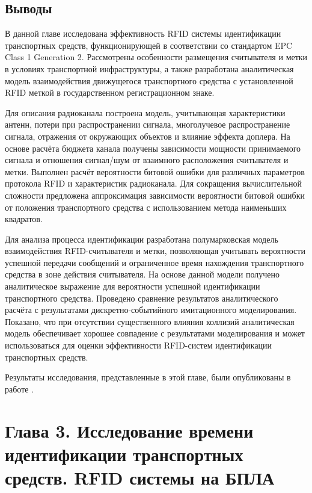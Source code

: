 \documentclass[12pt]{article}
\theoremstyle{definition}
\begin{document}
\subsection*{Выводы}

В данной главе исследована эффективность RFID системы идентификации транспортных средств, функционирующей в соответствии со стандартом EPC Class 1 Generation 2. Рассмотрены особенности размещения считывателя и метки в условиях транспортной инфраструктуры, а также разработана аналитическая модель взаимодействия движущегося транспортного средства с установленной RFID меткой в государственном регистрационном знаке.

Для описания радиоканала построена модель, учитывающая характеристики антенн, потери при распространении сигнала, многолучевое распространение сигнала, отражения от окружающих объектов и влияние эффекта доплера. На основе расчёта бюджета канала получены зависимости мощности принимаемого сигнала и отношения сигнал/шум от взаимного расположения считывателя и метки. Выполнен расчёт вероятности битовой ошибки для различных параметров протокола RFID и характеристик радиоканала. Для сокращения вычислительной сложности предложена аппроксимация зависимости вероятности битовой ошибки от положения транспортного средства с использованием метода наименьших квадратов.

Для анализа процесса идентификации разработана полумарковская модель взаимодействия RFID-считывателя и метки, позволяющая учитывать вероятности успешной передачи сообщений и ограниченное время нахождения транспортного средства в зоне действия считывателя. На основе данной модели получено аналитическое выражение для вероятности успешной идентификации транспортного средства. Проведено сравнение результатов аналитического расчёта с результатами дискретно-событийного имитационного моделирования. Показано, что при отсутствии существенного влияния коллизий аналитическая модель обеспечивает хорошее совпадение с результатами моделирования и может использоваться для оценки эффективности RFID-систем идентификации транспортных средств.

Результаты исследования, представленные в этой главе, были опубликованы в работе \cite{Vishn2023}.

\pagebreak

\section{Глава 3. Исследование времени идентификации транспортных средств. RFID системы на БПЛА}
\label{sec:ch3}
\end{document}
